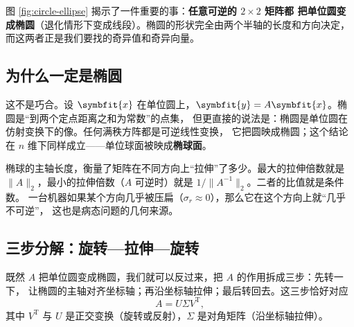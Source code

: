 \documentclass[UTF8, 11pt, a4paper, fontset=windows]{ctexart}
\theoremstyle{cnthm}
\theoremstyle{cndef}
\newcommand{\T}{^{\mathrm{T}}}
\newcommand{\nrm}[1]{\lVert #1 \rVert}
\newcommand{\x}{\symbfit{x}}
\newcommand{\y}{\symbfit{y}}
\begin{document}
图 \ref{fig:circle-ellipse} 揭示了一件重要的事：\textbf{任意可逆的 $2\times2$ 矩阵都
把单位圆变成椭圆}（退化情形下变成线段）。椭圆的形状完全由两个半轴的长度和方向决定，
而这两者正是我们要找的奇异值和奇异向量。

\subsection{为什么一定是椭圆}

这不是巧合。设 $\x$ 在单位圆上，$\y=A\x$。椭圆是“到两个定点距离之和为常数”的点集，
但更直接的说法是：椭圆是单位圆在仿射变换下的像。任何满秩方阵都是可逆线性变换，
它把圆映成椭圆；这个结论在 $n$ 维下同样成立——单位球面被映成\textbf{椭球面}。

椭球的主轴长度，衡量了矩阵在不同方向上“拉伸”了多少。最大的拉伸倍数就是
$\nrm{A}_2$，最小的拉伸倍数（$A$ 可逆时）就是 $1/\nrm{A^{-1}}_2$。二者的比值就是条件数。
一台机器如果某个方向几乎被压扁（$\sigma_r\approx0$），那么它在这个方向上就“几乎不可逆”，
这也是病态问题的几何来源。

\subsection{三步分解：旋转—拉伸—旋转}

既然 $A$ 把单位圆变成椭圆，我们就可以反过来，把 $A$ 的作用拆成三步：先转一下，
让椭圆的主轴对齐坐标轴；再沿坐标轴拉伸；最后转回去。这三步恰好对应
\begin{equation}
  A=U\Sigma V\T ,
\end{equation}
其中 $V\T$ 与 $U$ 是正交变换（旋转或反射），$\Sigma$ 是对角矩阵（沿坐标轴拉伸）。
\end{document}
